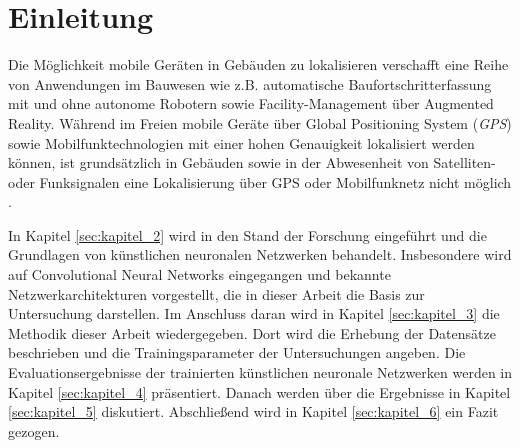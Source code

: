 
\section{Einleitung}
%
%
%
%
%
%
%
%
%
%
%
%
%
%
%
%
%
%
%
%


Die Möglichkeit mobile Geräten in Gebäuden zu lokalisieren verschafft eine Reihe von Anwendungen im Bauwesen wie z.B. automatische Baufortschritterfassung mit und ohne autonome Robotern sowie Facility-Management über Augmented Reality.
Während im Freien mobile Geräte über Global Positioning System (\textit{GPS}) sowie Mobilfunktechnologien mit einer hohen Genauigkeit lokalisiert werden können, ist grundsätzlich in Gebäuden sowie in der Abwesenheit von Satelliten- oder Funksignalen eine Lokalisierung über GPS oder Mobilfunknetz nicht möglich \cite{yassinRecentAdvancesIndoor2016}.




In Kapitel \ref{sec:kapitel_2} wird in den Stand der Forschung eingeführt und die Grundlagen von künstlichen neuronalen Netzwerken behandelt. Insbesondere wird auf Convolutional Neural Networks eingegangen und bekannte Netzwerkarchitekturen vorgestellt, die in dieser Arbeit die Basis zur Untersuchung darstellen.
Im Anschluss daran wird in Kapitel \ref{sec:kapitel_3} die Methodik dieser Arbeit wiedergegeben. Dort wird die Erhebung der Datensätze beschrieben und die Trainingsparameter der Untersuchungen angeben. 
Die Evaluationsergebnisse der trainierten künstlichen neuronale Netzwerken werden in Kapitel \ref{sec:kapitel_4} präsentiert. Danach werden über die Ergebnisse in Kapitel \ref{sec:kapitel_5} diskutiert. Abschließend wird in Kapitel \ref{sec:kapitel_6} ein Fazit gezogen. 


